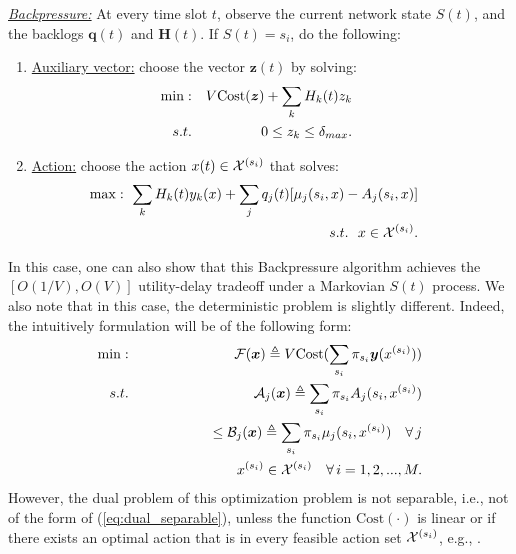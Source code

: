 \documentclass[journal]{IEEEtran}
\newcommand{\bv}[1]{{\boldsymbol{#1} }}
\newcommand{\script}[1]{{{\cal{#1} }}}
\begin{document}
\underline{\emph{Backpressure:}} At every time slot $t$, observe the current network state $S(t)$, and the backlogs $\bv{q}(t)$ and $\bv{H}(t)$. If $S(t)=s_i$, do the following: 
\begin{enumerate}
\item \underline{Auxiliary vector:} choose the vector $\bv{z}(t)$ by solving: 
\begin{eqnarray}
\hspace{-.3in}\min: && V\text{Cost}(\bv{z})+\sum_{k}H_k(t)z_k\nonumber\\
\hspace{-.3in}s.t. && 0\leq z_k\leq\delta_{max}.\label{eq:qla-auxi}
\end{eqnarray}

\item \underline{Action:} choose the action $x(t)\in\script{X}^{(s_i)}$ that solves:
\begin{eqnarray}
\hspace{-.5in}&&\max: \,\, \sum_{k}H_k(t)y_k(x)+\sum_jq_j(t)[\mu_j(s_i, x)- A_j(s_i, x)]\nonumber\\
\hspace{-.5in}&&\quad s.t. \,\,\,\, x\in\script{X}^{(s_i)}.\label{eq:qla-actual}
\end{eqnarray}
\end{enumerate}
In this case, one can also show that this Backpressure algorithm achieves the $[O(1/V), O(V)]$ utility-delay tradeoff under a Markovian $S(t)$ process. %
We also note that in this case, the deterministic problem is slightly different. Indeed, the intuitively formulation will be of the following form: 
\begin{eqnarray}
\min:&&\script{F}(\bv{x})\triangleq V\text{Cost}(\sum_{s_i}\pi_{s_i}\bv{y}(x^{(s_i)}))\label{eq:primal_func}\\
s.t.&&\script{A}_j(\bv{x})\triangleq\sum_{s_i}\pi_{s_i}A_j(s_i, x^{(s_i)})\nonumber\\
&&\qquad\qquad\quad\leq \script{B}_j(\bv{x})\triangleq\sum_{s_i}\pi_{s_i}\mu_j(s_i, x^{(s_i)})\quad\forall\, j\nonumber\\
&& x^{(s_i)}\in \script{X}^{(s_i)}\quad \forall\, i=1, 2, ..., M.\nonumber
\end{eqnarray}
However, the dual problem of this optimization problem is not separable, i.e., not of the form of (\ref{eq:dual_separable}), unless the function $\text{Cost}(\cdot)$ is linear or if there exists an optimal action that is in every feasible action set $\script{X}^{(s_i)}$, e.g.,  \cite{neelyfairness}. 
\end{document}
